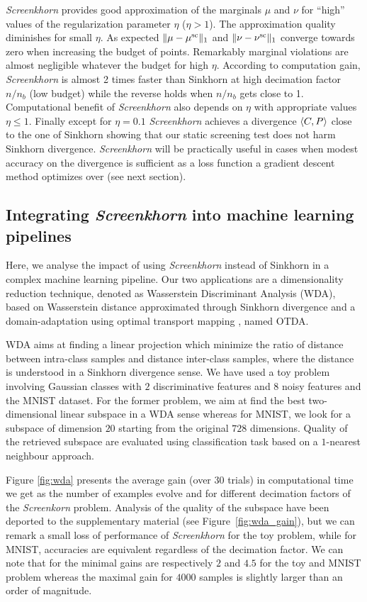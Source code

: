 \emph{Screenkhorn} provides good approximation of the marginals $\mu$ and $\nu$ for ``high'' values of the regularization parameter $\eta$ ($\eta > 1$). The approximation quality diminishes for small $\eta$. As expected $\|{\mu} -{\mu}^{\text{sc}}\|_1$ and $\|{\nu} -{\nu}^{\text{sc}}\|_1$ converge towards zero when increasing the budget of points. Remarkably marginal violations are almost negligible whatever the budget for high $\eta$.  According to computation gain, \emph{Screenkhorn} is almost  2 times faster than Sinkhorn at high decimation factor $n/n_b$ (low budget) while the reverse holds when $n/n_b$ gets close to 1.  Computational benefit of \emph{Screenkhorn} also depends on $\eta$ with appropriate values $\eta \leq 1$. Finally except for $\eta=0.1$ \emph{Screenkhorn} achieves a  divergence $\langle C, P \rangle$ close to the one of Sinkhorn showing that our static screening test does not harm Sinkhorn divergence.  \emph{Screenkhorn} will be practically useful in cases when modest accuracy on the divergence is sufficient as a loss function a gradient descent method optimizes over (see next section).


\subsection{Integrating \emph{Screenkhorn} into machine learning pipelines}

Here, we analyse the impact of using \emph{Screenkhorn}
instead of Sinkhorn in a complex machine learning pipeline. Our two applications
are a dimensionality reduction technique, denoted as Wasserstein Discriminant Analysis (WDA), based on Wasserstein distance approximated
through Sinkhorn divergence \citep{flamary2018WDA} and a domain-adaptation using optimal transport mapping \citep{courty2017optimal}, named OTDA. 

WDA aims at finding a linear projection which minimize the ratio of distance between intra-class samples and distance inter-class samples, where the distance is understood
in a Sinkhorn divergence sense. We have used a toy problem involving Gaussian classes with $2$ discriminative features and $8$ noisy features and the MNIST dataset. For the
former problem, we aim at find the best two-dimensional linear subspace in a WDA sense whereas for MNIST, we look for a subspace of dimension $20$ starting from the original
$728$ dimensions.  Quality of the retrieved subspace are evaluated using classification task based on a $1$-nearest neighbour approach.

Figure \ref{fig:wda} presents the average gain (over $30$ trials) in computational time we get as the number of examples evolve and for different decimation factors of the \emph{Screenkorn} problem.
Analysis of the quality of the subspace have been deported to the supplementary material (see Figure~\ref{fig:wda_gain}), but we can remark a small loss of performance of \emph{Screenkhorn} for the toy problem, while
for MNIST, accuracies are equivalent regardless of the decimation factor.  We can note
that for the minimal gains are respectively $2$ and $4.5$ for the toy and MNIST problem
whereas the maximal gain for $4000$ samples is slightly larger than an order of magnitude. 

